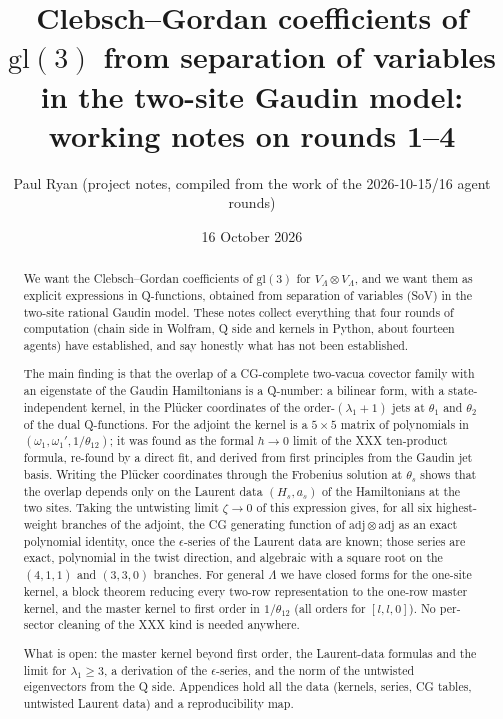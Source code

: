 \documentclass[11pt]{article}
\title{Clebsch--Gordan coefficients of $\mathrm{gl}(3)$ from separation of variables in the two-site Gaudin model: working notes on rounds 1--4}
\author{Paul Ryan (project notes, compiled from the work of the 2026-10-15/16 agent rounds)}
\date{16 October 2026}
\begin{document}
\maketitle

\begin{abstract}
We want the Clebsch--Gordan coefficients of $\mathrm{gl}(3)$ for $V_\Lambda\otimes V_\Lambda$, and we want them as explicit expressions in Q-functions, obtained from separation of variables (SoV) in the two-site rational Gaudin model.
These notes collect everything that four rounds of computation (chain side in Wolfram, Q side and kernels in Python, about fourteen agents) have established, and say honestly what has not been established.

The main finding is that the overlap of a CG-complete two-vacua covector family with an eigenstate of the Gaudin Hamiltonians is a Q-number: a bilinear form, with a state-independent kernel, in the Plücker coordinates of the order-$(\lambda_1+1)$ jets at $\theta_1$ and $\theta_2$ of the dual Q-functions.
For the adjoint the kernel is a $5\times5$ matrix of polynomials in $(\omega_1,\omega_1',1/\theta_{12})$; it was found as the formal $h\to0$ limit of the XXX ten-product formula, re-found by a direct fit, and derived from first principles from the Gaudin jet basis.
Writing the Plücker coordinates through the Frobenius solution at $\theta_s$ shows that the overlap depends only on the Laurent data $(H_s,a_s)$ of the Hamiltonians at the two sites.
Taking the untwisting limit $\zeta\to0$ of this expression gives, for all six highest-weight branches of the adjoint, the CG generating function of $\mathrm{adj}\otimes\mathrm{adj}$ as an exact polynomial identity, once the $\epsilon$-series of the Laurent data are known; those series are exact, polynomial in the twist direction, and algebraic with a square root on the $(4,1,1)$ and $(3,3,0)$ branches.
For general $\Lambda$ we have closed forms for the one-site kernel, a block theorem reducing every two-row representation to the one-row master kernel, and the master kernel to first order in $1/\theta_{12}$ (all orders for $[l,l,0]$).
No per-sector cleaning of the XXX kind is needed anywhere.

What is open: the master kernel beyond first order, the Laurent-data formulas and the limit for $\lambda_1\ge3$, a derivation of the $\epsilon$-series, and the norm of the untwisted eigenvectors from the Q side.
Appendices hold all the data (kernels, series, CG tables, untwisted Laurent data) and a reproducibility map.
\end{abstract}
\end{document}

